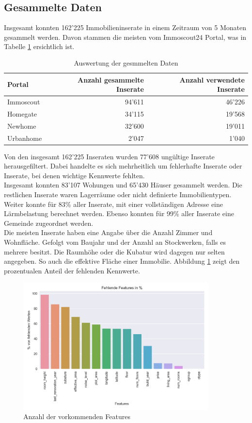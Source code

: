 \subsection{Gesammelte Daten}
Insgesamt konnten 162’225 Immobilieninserate in einem Zeitraum von 5 Monaten gesammelt werden. Davon stammen die meisten vom Immoscout24 Portal, was in Tabelle \ref{tab:crawled_data} ersichtlich ist.
\begin{table}[ht]
\centering
{}
\begin{tabular}{@{}lrr@{}}
\toprule
Portal & Anzahl gesammelte Inserate & Anzahl verwendete Inserate \\
\midrule
Immoscout & 94'611 & 46'226\\
Homegate & 34'115 & 19'568\\
Newhome & 32'600 & 19'011\\
Urbanhome & 2'047 & 1'040\\
\bottomrule
\end{tabular}
\caption{Auswertung der gesmmelten Daten}
\label{tab:crawled_data}
\end{table}
%
Von den insgesamt 162’225 Inseraten wurden 77’608 ungültige Inserate herausgefiltert. 
Dabei handelte es sich mehrheitlich um fehlerhafte Inserate oder Inserate, bei denen wichtige Kennwerte fehlten.\\
Insgesamt konnten 83’107 Wohungen und 65’430 Häuser gesammelt werden. Die restlichen Inserate waren Lagerräume oder nicht definierte Immobilientypen.\\
Weiter konnte für 83\% aller Inserate, mit einer vollständigen Adresse eine Lärmbelastung berechnet werden. Ebenso konnten für 99\% aller Inserate eine Gemeinde zugeordnet werden.\\
Die meisten Inserate haben eine Angabe über die Anzahl Zimmer und Wohnfläche. Gefolgt vom Baujahr und der Anzahl an Stockwerken, falls es mehrere besitzt. Die Raumhöhe oder die Kubatur wird dagegen nur selten angegeben. So auch die effektive Fläche einer Immobilie. Abbildung \ref{fig:features} zeigt den prozentualen Anteil der fehlenden Kennwerte.\\[2ex]
\begin{figure}[h!]
\centering
\includegraphics[width=0.9\textwidth]{images/missing_values.png}
\caption[Anzahl der vorkommenden Features]{Anzahl der vorkommenden Features}%
\label{fig:features}
\end{figure}
